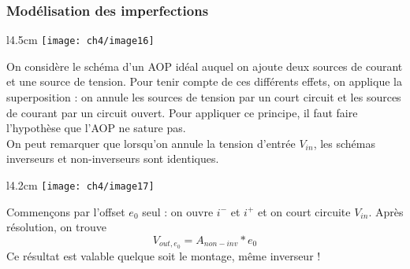 		\subsubsection{Modélisation des imperfections}
		\begin{wrapfigure}[10]{l}{4.5cm}
		\vspace{-0.5cm}
		\texttt{[image: ch4/image16]}
		\end{wrapfigure}	
		On considère le schéma d'un AOP idéal auquel on ajoute deux sources de 
		courant et une source de tension. Pour tenir compte de ces différents 
		effets, on applique la superposition : on annule les sources de tension 
		par un court circuit et les sources de courant par un circuit ouvert. Pour 
		appliquer ce principe, il faut faire l'hypothèse que l'AOP ne sature pas.\\
		
		On peut remarquer que lorsqu'on annule la tension d'entrée $V_{in}$, les 
		schémas inverseurs et non-inverseurs sont identiques.\\
		
		\newpage
			\begin{wrapfigure}[10]{l}{4.2cm}
		\vspace{-0.5cm}
		\texttt{[image: ch4/image17]}
		\end{wrapfigure}
		Commençons par l'offset $e_0$ seul : on ouvre $i^-$ et $i^+$ et on court 
		circuite $V_{in}$. Après résolution, on trouve
		\begin{equation}
		V_{out,e_0} = A_{non-inv}*e_0
		\end{equation}
		Ce résultat est valable quelque soit le montage, même inverseur !\\
		
